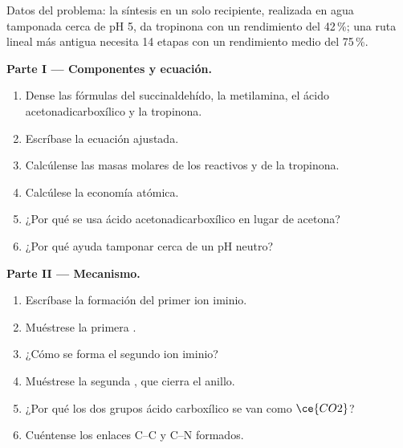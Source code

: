 \begin{problem}
\label{pb:b3:total-synthesis:1}
Datos del problema: la síntesis en un solo recipiente, realizada en agua tamponada cerca de pH 5,
da tropinona con un rendimiento del 42\,\%; una ruta lineal más antigua necesita 14 etapas con un rendimiento medio del 75\,\%.

\medskip\noindent\textbf{Parte I --- Componentes y ecuación.}
\begin{enumerate}
  \item Dense las fórmulas del succinaldehído, la metilamina, el ácido acetonadicarboxílico
        y la tropinona.
  \item Escríbase la ecuación ajustada.
  \item Calcúlense las masas molares de los reactivos y de la tropinona.
  \item Calcúlese la economía atómica.
  \item ¿Por qué se usa ácido acetonadicarboxílico en lugar de acetona?
  \item ¿Por qué ayuda tamponar cerca de un pH neutro?
\end{enumerate}

\medskip\noindent\textbf{Parte II --- Mecanismo.}
\begin{enumerate}[resume]
  \item Escríbase la formación del primer ion iminio.
  \item Muéstrese la primera .
  \item ¿Cómo se forma el segundo ion iminio?
  \item Muéstrese la segunda , que cierra el anillo.
  \item ¿Por qué los dos grupos ácido carboxílico se van como $\ce{CO2}$?
  \item Cuéntense los enlaces C--C y C--N formados.
\end{enumerate}


\end{problem}
